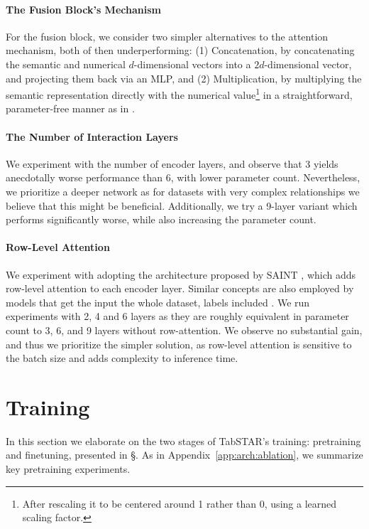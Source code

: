 \paragraph{The Fusion Block's Mechanism} For the fusion block, we consider two simpler alternatives to the attention mechanism, both of then underperforming: (1) Concatenation, by concatenating the semantic and numerical $d$-dimensional vectors into a $2d$-dimensional vector, and projecting them back via an MLP, and (2) Multiplication, by multiplying the semantic representation directly with the numerical value\footnote{After rescaling it to be centered around 1 rather than 0, using a learned scaling factor.} in a straightforward, parameter‐free manner as in \cite{wang_transtab_2022, ye_towards_2024}.

\paragraph{The Number of Interaction Layers} We experiment with the number of encoder layers, and observe that 3 yields anecdotally worse performance than 6, with lower parameter count. Nevertheless, we prioritize a deeper network as for datasets with very complex relationships we believe that this might be beneficial. Additionally, we try a 9-layer variant which performs significantly worse, while also increasing the parameter count. 

\paragraph{Row-Level Attention}\label{app:arch:saint} We experiment with adopting the architecture proposed by SAINT \cite{somepalli_saint_2021}, which adds row-level attention to each encoder layer. Similar concepts are also employed by models that get the input the whole dataset, labels included \cite{hollmann_accurate_2025, kossen_self-attention_2021}. We run experiments with 2, 4 and 6 layers as they are roughly equivalent in parameter count to 3, 6, and 9 layers without row-attention. We observe no substantial gain, and thus we prioritize the simpler solution, as row-level attention is sensitive to the batch size and adds complexity to inference time.


\section{Training}
\label{app:train}

In this section we elaborate on the two stages of TabSTAR's training: pretraining and finetuning, presented in \S{}. As in Appendix~\ref{app:arch:ablation}, we summarize key pretraining experiments.

